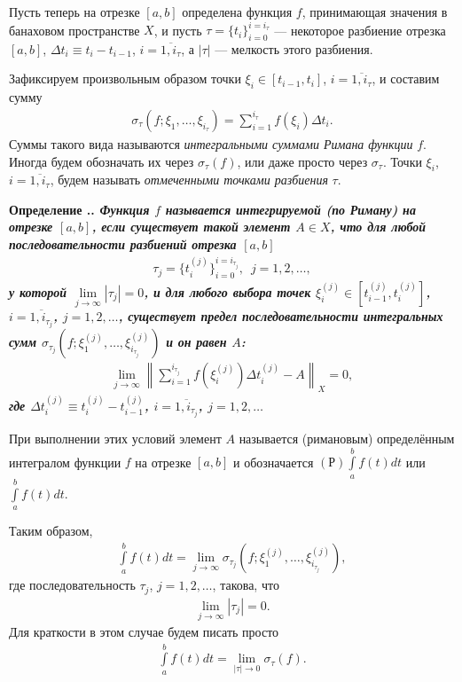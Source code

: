 \documentclass{report}
\newcounter{defin}[section]
\renewcommand{\thedefin}{\thesection.\arabic{defin}}
\newenvironment{Definition}{\par\refstepcounter{defin}\bf Определение
\thedefin.\it}{\rm\par}
\begin{document}
Пусть теперь на отрезке $[a,b]$ определена функция $f$, принимающая значения в банаховом пространстве $X$, и пусть $\tau=\{t_i\}^{i=i_\tau}_{i=0}$ --- некоторое разбиение отрезка $[a,b]$,
$\Delta t_i\equiv t_i-t_{i-1}$, $i=\overline{1,i_\tau}$, а $|\tau|$ --- мелкость этого разбиения.

Зафиксируем произвольным образом точки $\xi_i\in[t_{i-1},t_i]$, $i=\overline{1,i_\tau}$, и составим сумму
\begin{gather*}
\sigma_\tau(f;\xi_1,\dots,\xi_{i_\tau})=\sum\limits_{i=1}^{i_\tau}f(\xi_i)\Delta t_i.
\end{gather*}
Суммы такого вида называются \textit{интегральными суммами Римана функции} $f$. Иногда будем обозначать их через $\sigma_\tau(f)$, или даже просто через $\sigma_\tau$. Точки $\xi_i$,
$i=\overline{1,i_\tau}$, будем называть \textit{отмеченными точками разбиения} $\tau$.


\begin{Definition}\label{Riemann1}
Функция $f$ называется интегрируемой (по Риману) на отрезке $[a,b]$, если существует такой элемент $A\in X$, что для любой последовательности разбиений отрезка $[a,b]$
\begin{gather*}
\tau_j=\{t_i^{(j)}\}^{i=i_{\tau_j}}_{i=0},\,\,\,j=1,2,\dots,
\end{gather*}
у которой $\lim\limits_{j\to\infty}|\tau_j|=0$, и для любого выбора точек $\xi^{(j)}_i\in[t^{(j)}_{i-1},t^{(j)}_i]$, $i=\overline{1,i_{\tau_j}}$, $j=1,2,\dots$, существует предел
последовательности интегральных сумм $\sigma_{\tau_j}(f;\xi^{(j)}_1,\dots,\xi^{(j)}_{i_{\tau_j}})$ и он равен $A$:
\begin{gather}\label{limintegralsums}
\lim\limits_{j\to\infty}\left\|\sum\limits_{i=1}^{i_{\tau_j}}f(\xi^{(j)}_i)\Delta t^{(j)}_i-A\right\|_X=0,
\end{gather}
где $\Delta t^{(j)}_i\equiv t^{(j)}_i-t^{(j)}_{i-1}$, $i=\overline{1,i_{\tau_j}}$, $j=1,2,\dots$

При выполнении этих условий элемент $A$ называется (римановым) определённым интегралом функции $f$ на отрезке $[a,b]$ и обозначается $(\textrm{Р})\int\limits_a^bf(t)dt$ или
$\int\limits_a^bf(t)dt$.
\end{Definition}

Таким образом,
\begin{gather*}
\int\limits_a^bf(t)dt=\lim\limits_{j\to\infty}\sigma_{\tau_j}(f;\xi^{(j)}_1,\dots,\xi^{(j)}_{i_{\tau_j}}),
\end{gather*}
где последовательность $\tau_j$, $j=1,2,\dots$, такова, что
\begin{gather*}
\lim\limits_{j\to\infty}|\tau_j|=0.
\end{gather*}
Для краткости в этом случае будем писать просто
\begin{gather*}
\int\limits_a^bf(t)dt=\lim\limits_{|\tau|\to0}\sigma_\tau(f).
\end{gather*}
\end{document}
